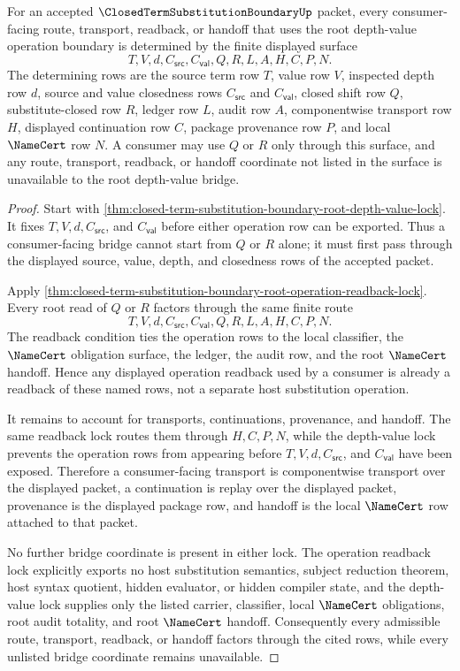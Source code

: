 \begin{lemma}
\label{lem:closed-term-substitution-boundary-root-depth-value-bridge-determinacy}
For an accepted $\ClosedTermSubstitutionBoundaryUp$ packet, every consumer-facing route, transport, readback, or handoff that uses the root depth-value operation boundary is determined by the finite displayed surface
$$
T,V,d,C_{\mathsf{src}},C_{\mathsf{val}},Q,R,L,A,H,C,P,N.
$$
The determining rows are the source term row $T$, value row $V$, inspected depth row $d$, source and value closedness rows $C_{\mathsf{src}}$ and $C_{\mathsf{val}}$, closed shift row $Q$, substitute-closed row $R$, ledger row $L$, audit row $A$, componentwise transport row $H$, displayed continuation row $C$, package provenance row $P$, and local $\NameCert$ row $N$. A consumer may use $Q$ or $R$ only through this surface, and any route, transport, readback, or handoff coordinate not listed in the surface is unavailable to the root depth-value bridge.
\end{lemma}
\begin{proof}
Start with \autoref{thm:closed-term-substitution-boundary-root-depth-value-lock}. It fixes $T,V,d,C_{\mathsf{src}}$, and $C_{\mathsf{val}}$ before either operation row can be exported. Thus a consumer-facing bridge cannot start from $Q$ or $R$ alone; it must first pass through the displayed source, value, depth, and closedness rows of the accepted packet.

Apply \autoref{thm:closed-term-substitution-boundary-root-operation-readback-lock}. Every root read of $Q$ or $R$ factors through the same finite route
$$
T,V,d,C_{\mathsf{src}},C_{\mathsf{val}},Q,R,L,A,H,C,P,N.
$$
The readback condition ties the operation rows to the local classifier, the $\NameCert$ obligation surface, the ledger, the audit row, and the root $\NameCert$ handoff. Hence any displayed operation readback used by a consumer is already a readback of these named rows, not a separate host substitution operation.

It remains to account for transports, continuations, provenance, and handoff. The same readback lock routes them through $H,C,P,N$, while the depth-value lock prevents the operation rows from appearing before $T,V,d,C_{\mathsf{src}}$, and $C_{\mathsf{val}}$ have been exposed. Therefore a consumer-facing transport is componentwise transport over the displayed packet, a continuation is replay over the displayed packet, provenance is the displayed package row, and handoff is the local $\NameCert$ row attached to that packet.

No further bridge coordinate is present in either lock. The operation readback lock explicitly exports no host substitution semantics, subject reduction theorem, host syntax quotient, hidden evaluator, or hidden compiler state, and the depth-value lock supplies only the listed carrier, classifier, local $\NameCert$ obligations, root audit totality, and root $\NameCert$ handoff. Consequently every admissible route, transport, readback, or handoff factors through the cited rows, while every unlisted bridge coordinate remains unavailable.
\end{proof}

